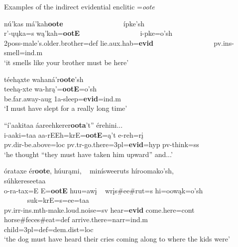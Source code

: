 \begin{exe}

\item\label{evidentialenclitic} Examples of the indirect evidential enclitic =\textit{oote}

	\begin{xlist}
	
	\item\label{evidentialenclitic1} 
	\glll nú'kas má'kah\textbf{oote} ~ ~ ~ ~ ~ ~ ~ ~ ~ ~ ípke'sh\\
	r'-ųųka=s wą'kah=\textbf{ootE} ~ ~ ~ ~ ~ ~ ~ ~ ~ ~  i-pke=o'sh\\
	2poss-\textnormal{male's.older.brother}=def \textnormal{lie}.aux.hab=\textbf{evid} ~ ~ ~ ~ ~ ~ ~ ~ ~ ~ pv.ins-\textnormal{smell}=ind.m\\
	\glt `it smells like your brother must be here' \citep[143]{hollow1973a}

	\item\label{evidentialenclitic2} 
	\glll téehąxte wahaná'r\textbf{oote}'sh\\
	teehą-xte wa-hrą'=\textbf{ootE}=o'sh\\
	\textnormal{be.far.away}-aug 1a-\textnormal{sleep}=\textbf{evid}=ind.m\\
	\glt `I must have slept for a really long time' \citep[145]{hollow1973a}

	\item\label{evidentialenclitic3} 
	\glll ``í'aakitaa áareehkerer\textbf{oota}'t'' érehini...\\
	i-aaki=taa aa-rEEh=krE=\textbf{ootE}=ą't e-reh=rį\\
	pv.dir-\textnormal{be.above}=loc pv.tr-\textnormal{go.there}=3pl=\textbf{evid}=hyp pv-\textnormal{think}=ss\\
	\glt `he thought ``they must have taken him upward'' and...' \citep[172]{hollow1973a}

	\item\label{evidentialenclitic4}
	\glll órataxe ér\textbf{oote}, húurąmi, ~   minísweeruts híroomako'sh, ~ ~ ~ ~ ~ ~ ~ ~ ~ ~ ~ ~ súhkereseetaa\\
	o-ra-tax=E E=\textbf{ootE} huu=awį ~   wrįs\#ee\#rut=s hi=oowąk=o'sh ~ ~ ~ ~ ~ ~ ~ ~ ~ ~ ~ ~  suk=krE=s=ee=taa\\
	pv.irr-ins.mth-\textnormal{make.loud.noise}=sv \textnormal{hear}=\textbf{evid} \textnormal{come.here}=cont ~  \textnormal{horse}\#\textnormal{feces}\#\textnormal{eat}=def \textnormal{arrive.there}=narr=ind.m ~ ~ ~ ~ ~ ~ ~ ~ ~ ~ ~ ~ \textnormal{child}=3pl=def=dem.dist=loc\\
	\glt `the dog must have heard their cries coming along to where the kids were' \citep[180]{hollow1973a}
	
	\end{xlist}

\end{exe}

